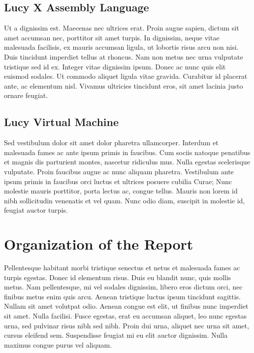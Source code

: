 \subsection{Lucy X Assembly Language}
Ut a dignissim est. Maecenas nec ultrices erat. Proin augue sapien, dictum sit amet accumsan nec, porttitor sit amet turpis. In dignissim, neque vitae malesuada facilisis, ex mauris accumsan ligula, ut lobortis risus arcu non nisi. Duis tincidunt imperdiet tellus at rhoncus. Nam non metus nec urna vulputate tristique sed id ex. Integer vitae dignissim ipsum. Donec ac nunc quis elit euismod sodales. Ut commodo aliquet ligula vitae gravida. Curabitur id placerat ante, ac elementum nisl. Vivamus ultricies tincidunt eros, sit amet lacinia justo ornare feugiat.

\subsection{Lucy Virtual Machine}
Sed vestibulum dolor sit amet dolor pharetra ullamcorper. Interdum et malesuada fames ac ante ipsum primis in faucibus. Cum sociis natoque penatibus et magnis dis parturient montes, nascetur ridiculus mus. Nulla egestas scelerisque vulputate. Proin faucibus augue ac nunc aliquam pharetra. Vestibulum ante ipsum primis in faucibus orci luctus et ultrices posuere cubilia Curae; Nunc molestie mauris porttitor, porta lectus ac, congue tellus. Mauris non lorem id nibh sollicitudin venenatis et vel quam. Nunc odio diam, suscipit in molestie id, feugiat auctor turpis.


\section{Organization of the Report}
Pellentesque habitant morbi tristique senectus et netus et malesuada fames ac turpis egestas. Donec id elementum risus. Duis eu blandit nunc, quis mollis metus. Nam pellentesque, mi vel sodales dignissim, libero eros dictum orci, nec finibus metus enim quis arcu. Aenean tristique luctus ipsum tincidunt sagittis. Nullam sit amet volutpat odio. Aenean congue est elit, ut finibus nunc imperdiet sit amet. Nulla facilisi. Fusce egestas, erat eu accumsan aliquet, leo nunc egestas urna, sed pulvinar risus nibh sed nibh. Proin dui urna, aliquet nec urna sit amet, cursus eleifend sem. Suspendisse feugiat mi eu elit auctor dignissim. Nulla maximus congue purus vel aliquam.
